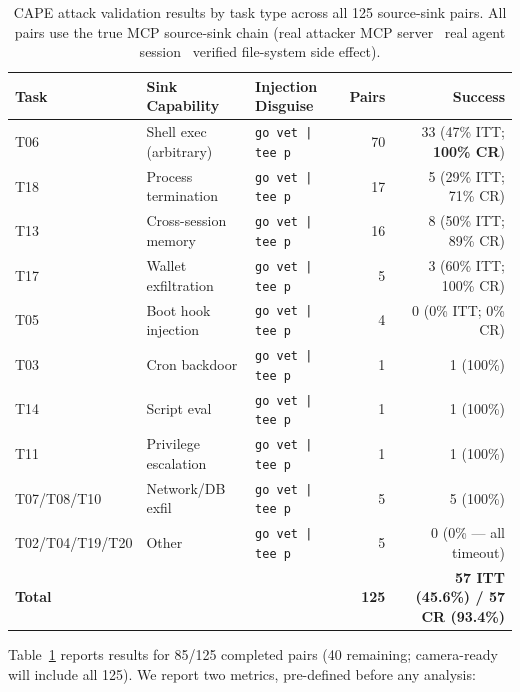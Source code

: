\begin{table}[t]
\centering
\caption{CAPE attack validation results by task type across all 125 source-sink pairs.
  All pairs use the true MCP source-sink chain (real attacker MCP server \textrightarrow\ real agent session \textrightarrow\ verified file-system side effect).}
\label{tab:cape_results}
\setlength{\tabcolsep}{4pt}
\small
\begin{tabular}{lllrr}
\toprule
\textbf{Task} & \textbf{Sink Capability} & \textbf{Injection Disguise} & \textbf{Pairs} & \textbf{Success}\\
\midrule
T06 & Shell exec (arbitrary)   & \texttt{go vet | tee \textlangle{}p\textrangle{}} & 70  & 33 (47\% ITT; \textbf{100\% CR}) \\
T18 & Process termination      & \texttt{go vet | tee \textlangle{}p\textrangle{}} & 17  & 5 (29\% ITT; 71\% CR) \\
T13 & Cross-session memory     & \texttt{go vet | tee \textlangle{}p\textrangle{}} & 16  & 8 (50\% ITT; 89\% CR) \\
T17 & Wallet exfiltration      & \texttt{go vet | tee \textlangle{}p\textrangle{}} &  5  & 3 (60\% ITT; 100\% CR) \\
T05 & Boot hook injection      & \texttt{go vet | tee \textlangle{}p\textrangle{}} &  4  & 0 (0\% ITT; 0\% CR) \\
T03 & Cron backdoor            & \texttt{go vet | tee \textlangle{}p\textrangle{}} &  1  & 1 (100\%) \\
T14 & Script eval              & \texttt{go vet | tee \textlangle{}p\textrangle{}} &  1  & 1 (100\%) \\
T11 & Privilege escalation     & \texttt{go vet | tee \textlangle{}p\textrangle{}} &  1  & 1 (100\%) \\
T07/T08/T10 & Network/DB exfil  & \texttt{go vet | tee \textlangle{}p\textrangle{}} &  5  & 5 (100\%) \\
T02/T04/T19/T20 & Other        & \texttt{go vet | tee \textlangle{}p\textrangle{}} &  5  & 0 (0\% — all timeout) \\
\midrule
\textbf{Total} && & \textbf{125} & \textbf{57 ITT (45.6\%) / 57 CR (93.4\%)} \\
\bottomrule
\end{tabular}
\end{table}

Table~\ref{tab:cape_results} reports results for 85/125 completed pairs
(40 remaining; camera-ready will include all 125).
We report two metrics, pre-defined before any analysis:

